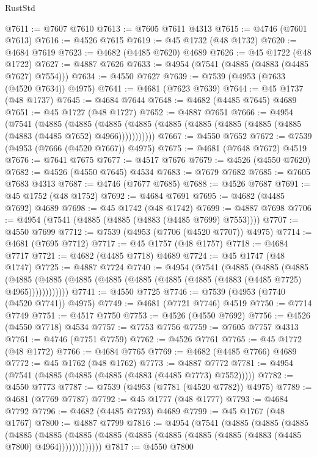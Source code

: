 \begin{lexlean}{RustStd}
\begin{coremodule}
@7611 := @7607 @7610
@7613 := @7605 @7611 @4313
@7615 := @4746 (@7601 @7613)
@7616 := @4526 @7615
@7619 := @45 @1732 (@48 @1732)
@7620 := @4684 @7619
@7623 := @4682 (@4485 @7620) @4689
@7626 := @45 @1722 (@48 @1722)
@7627 := @4887 @7626
@7633 := @4954 (@7541 (@4885 (@4883 (@4485 @7627) @7554)))
@7634 := @4550 @7627
@7639 := @7539 (@4953 (@7633 (@4520 @7634)) @4975)
@7641 := @4681 (@7623 @7639)
@7644 := @45 @1737 (@48 @1737)
@7645 := @4684 @7644
@7648 := @4682 (@4485 @7645) @4689
@7651 := @45 @1727 (@48 @1727)
@7652 := @4887 @7651
@7666 := @4954
    (@7541
      (@4885
        (@4885
          (@4885 (@4885 (@4885 (@4885 (@4885 (@4885 (@4885 (@4883 (@4485 @7652) @4966)))))))))))
@7667 := @4550 @7652
@7672 := @7539 (@4953 (@7666 (@4520 @7667)) @4975)
@7675 := @4681 (@7648 @7672) @4519
@7676 := @7641 @7675
@7677 := @4517 @7676
@7679 := @4526 (@4550 @7620)
@7682 := @4526 (@4550 @7645) @4534
@7683 := @7679 @7682
@7685 := @7605 @7683 @4313
@7687 := @4746 (@7677 @7685)
@7688 := @4526 @7687
@7691 := @45 @1752 (@48 @1752)
@7692 := @4684 @7691
@7695 := @4682 (@4485 @7692) @4689
@7698 := @45 @1742 (@48 @1742)
@7699 := @4887 @7698
@7706 := @4954 (@7541 (@4885 (@4885 (@4883 (@4485 @7699) @7553))))
@7707 := @4550 @7699
@7712 := @7539 (@4953 (@7706 (@4520 @7707)) @4975)
@7714 := @4681 (@7695 @7712)
@7717 := @45 @1757 (@48 @1757)
@7718 := @4684 @7717
@7721 := @4682 (@4485 @7718) @4689
@7724 := @45 @1747 (@48 @1747)
@7725 := @4887 @7724
@7740 := @4954
    (@7541
      (@4885
        (@4885
          (@4885
            (@4885 (@4885 (@4885 (@4885 (@4885 (@4885 (@4885 (@4883 (@4485 @7725) @4965))))))))))))
@7741 := @4550 @7725
@7746 := @7539 (@4953 (@7740 (@4520 @7741)) @4975)
@7749 := @4681 (@7721 @7746) @4519
@7750 := @7714 @7749
@7751 := @4517 @7750
@7753 := @4526 (@4550 @7692)
@7756 := @4526 (@4550 @7718) @4534
@7757 := @7753 @7756
@7759 := @7605 @7757 @4313
@7761 := @4746 (@7751 @7759)
@7762 := @4526 @7761
@7765 := @45 @1772 (@48 @1772)
@7766 := @4684 @7765
@7769 := @4682 (@4485 @7766) @4689
@7772 := @45 @1762 (@48 @1762)
@7773 := @4887 @7772
@7781 := @4954 (@7541 (@4885 (@4885 (@4885 (@4883 (@4485 @7773) @7552)))))
@7782 := @4550 @7773
@7787 := @7539 (@4953 (@7781 (@4520 @7782)) @4975)
@7789 := @4681 (@7769 @7787)
@7792 := @45 @1777 (@48 @1777)
@7793 := @4684 @7792
@7796 := @4682 (@4485 @7793) @4689
@7799 := @45 @1767 (@48 @1767)
@7800 := @4887 @7799
@7816 := @4954
    (@7541
      (@4885
        (@4885
          (@4885
            (@4885
              (@4885
                (@4885 (@4885 (@4885 (@4885 (@4885 (@4885 (@4883 (@4485 @7800) @4964)))))))))))))
@7817 := @4550 @7800

\end{coremodule}
\end{lexlean}

